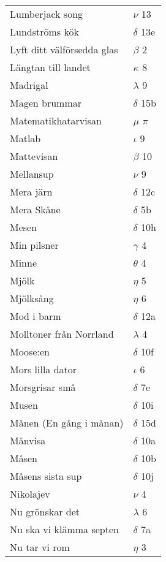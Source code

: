 \documentclass[a6paper,10pt]{article}
\begin{document}
\newpage
\setlength{\oddsidemargin}{-0.37in}
\begin{table}[!h]
\begin{tabular}{l l}
Lumberjack song	&$\nu$ 13\\
Lundströms kök	&$\delta$ 13e\\
Lyft ditt välförsedda glas&	$\beta$ 2\\
Längtan till landet&	$\kappa$ 8\\
Madrigal&	$\lambda$ 9\\
Magen brummar&	$\delta$ 15b\\
Matematikhatarvisan& $\mu$ $\pi$\\
Matlab	&$\iota$ 9\\
Mattevisan&	$\beta$ 10\\
Mellansup	&$\nu$ 9\\
Mera järn&	$\delta$ 12c\\
Mera Skåne	&$\delta$ 5b\\
Mesen&	$\delta$ 10h\\
Min pilsner	&$\gamma$ 4\\
Minne&	$\theta$ 4\\
Mjölk	&$\eta$ 5\\
Mjölksång&	$\eta$ 6\\
Mod i barm&$\delta$ 12a\\
Molltoner från Norrland&	$\lambda$ 4\\
Moose:en	&$\delta$ 10f\\
Mors lilla dator&	$\iota$ 6\\
Morsgrisar små&	$\delta$ 7e\\
Musen	&$\delta$ 10i\\
Månen (En gång i månan)&	$\delta$ 15d\\
Månvisa&	$\delta$ 10a\\
Måsen	&$\delta$ 10b\\
Måsens sista sup&	$\delta$ 10j\\
Nikolajev	&$\nu$ 4\\
Nu grönskar det&	$\lambda$ 6\\
Nu ska vi klämma septen	&$\delta$ 7a\\
Nu tar vi rom&	$\eta$ 3\\
\end{tabular}
\end{table}
\end{document}
